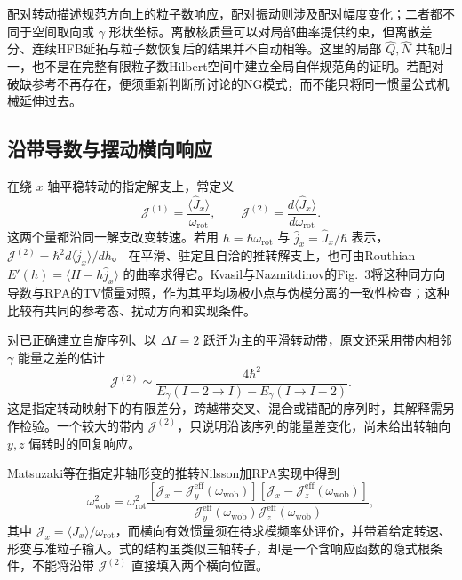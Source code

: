 配对转动描述规范方向上的粒子数响应，配对振动则涉及配对幅度变化；二者都不同于空间取向或 \(\gamma\) 形状坐标。离散核质量可以对局部曲率提供约束，但离散差分、连续HFB延拓与粒子数恢复后的结果并不自动相等。这里的局部 \(\hat Q,\hat N\) 共轭归一，也不是在完整有限粒子数Hilbert空间中建立全局自伴规范角的证明。若配对破缺参考不再存在，便须重新判断所讨论的NG模式，而不能只将同一惯量公式机械延伸过去。\cite{hinohara-2015-nambu-goldstone-inertia-response}

\subsection{沿带导数与摆动横向响应}\label{sec:2-6-6}

在绕 \(x\) 轴平稳转动的指定解支上，常定义
\begin{equation}\label{eq:2-6-band-inertias}
\mathcal J^{(1)}
=\frac{\langle\hat J_x\rangle}{\omega_{\mathrm{rot}}},
\qquad
\mathcal J^{(2)}
=\frac{d\langle\hat J_x\rangle}{d\omega_{\mathrm{rot}}}.
\end{equation}
这两个量都沿同一解支改变转速。若用 \(h=\hbar\omega_{\mathrm{rot}}\) 与 \(\hat j_x=\hat J_x/\hbar\) 表示，
\(\mathcal J^{(2)}=\hbar^2d\langle\hat j_x\rangle/dh\)。
在平滑、驻定且自洽的推转解支上，也可由Routhian \(E'(h)=\langle H-h\hat j_x\rangle\) 的曲率求得它。Kvasil与Nazmitdinov的Fig.~3将这种同方向导数与RPA的TV惯量对照，作为其平均场极小点与伪模分离的一致性检查；这种比较有共同的参考态、扰动方向和实现条件。\cite[PDF~p.~4, Fig.~3及相邻正文]{kvasil-2006-dy156-yb162-crpa-wobbling}

对已正确建立自旋序列、以 \(\Delta I=2\) 跃迁为主的平滑转动带，原文还采用带内相邻 \(\gamma\) 能量之差的估计
\begin{equation}\label{eq:2-6-band-finite-difference}
\mathcal J^{(2)}\simeq
\frac{4\hbar^2}
{E_\gamma(I+2\to I)-E_\gamma(I\to I-2)} .
\end{equation}
这是指定转动映射下的有限差分，跨越带交叉、混合或错配的序列时，其解释需另作检验。一个较大的带内 \(\mathcal J^{(2)}\)，只说明沿该序列的能量差变化，尚未给出转轴向 \(y,z\) 偏转时的回复响应。

Matsuzaki等在指定非轴形变的推转Nilsson加RPA实现中得到
\begin{equation}\label{eq:2-6-wobbling-response}
\omega_{\mathrm{wob}}^2
=\omega_{\mathrm{rot}}^2
\frac{
[\mathcal J_x-\mathcal J_y^{\mathrm{eff}}(\omega_{\mathrm{wob}})]
[\mathcal J_x-\mathcal J_z^{\mathrm{eff}}(\omega_{\mathrm{wob}})]
}{
\mathcal J_y^{\mathrm{eff}}(\omega_{\mathrm{wob}})
\mathcal J_z^{\mathrm{eff}}(\omega_{\mathrm{wob}})
},
\end{equation}
其中 \(\mathcal J_x=\langle J_x\rangle/\omega_{\mathrm{rot}}\)，而横向有效惯量须在待求模频率处评价，并带着给定转速、形变与准粒子输入。式的结构虽类似三轴转子，却是一个含响应函数的隐式根条件，不能将沿带 \(\mathcal J^{(2)}\) 直接填入两个横向位置。\cite[PDF~pp.~3--5, Eqs.~(8)--(12)]{matsuzaki-2004-nuclear-inertia-and-wobbling}

